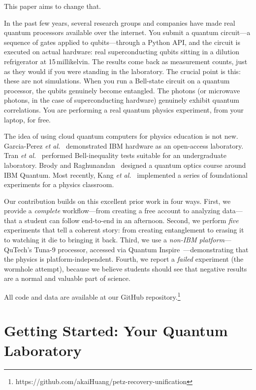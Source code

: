 \documentclass[amsmath,amssymb,reprint,aps,prb]{revtex4-2}
\begin{document}
This paper aims to change that.

In the past few years, several research groups and companies have
made real quantum processors available over the internet.  You submit
a quantum circuit---a sequence of gates applied to qubits---through
a Python API, and the circuit is executed on actual hardware: real
superconducting qubits sitting in a dilution refrigerator at
15\,millikelvin.  The results come back as measurement counts, just
as they would if you were standing in the laboratory.  The crucial
point is this: these are not simulations.  When you run a Bell-state
circuit on a quantum processor, the qubits genuinely become
entangled.  The photons (or microwave photons, in the case of
superconducting hardware) genuinely exhibit quantum correlations.
You are performing a real quantum physics experiment, from your
laptop, for free.

The idea of using cloud quantum computers for physics education is
not new.  Garcia-Perez \textit{et al.}~\cite{GarciaPerez2020}
demonstrated IBM hardware as an open-access laboratory.  Tran
\textit{et al.}~\cite{Tran2022} performed Bell-inequality tests
suitable for an undergraduate laboratory.  Brody and
Raghunandan~\cite{Brody2023} designed a quantum optics course
around IBM Quantum.  Most recently, Kang \textit{et al.}~\cite{Kang2026}
implemented a series of foundational experiments for a physics
classroom.

Our contribution builds on this excellent prior work in four ways.
First, we provide a \emph{complete} workflow---from creating a free
account to analyzing data---that a student can follow end-to-end in
an afternoon.  Second, we perform \emph{five} experiments that tell
a coherent story: from creating entanglement to erasing it to
watching it die to bringing it back.  Third, we use a
\emph{non-IBM platform}---QuTech's Tuna-9 processor, accessed via
Quantum Inspire~\cite{QI2022}---demonstrating that the physics is
platform-independent.  Fourth, we report a \emph{failed}
experiment (the wormhole attempt), because we believe students
should see that negative results are a normal and valuable part of
science.

All code and data are available at our GitHub
repository.\footnote{https://github.com/akaiHuang/petz-recovery-unification}


\section{Getting Started: Your Quantum Laboratory}
\label{sec:setup}
\end{document}
